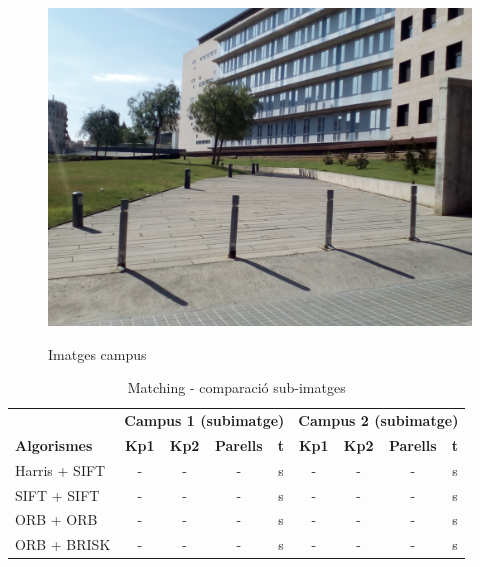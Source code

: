 \begin{figure}[!htb]
				\label{fig:awesome_image3}
			\endminipage\hfill
				\includegraphics[width=\linewidth]{images/experiments/uni4}
				\label{fig:awesome_image3}
			\endminipage
			\caption{Imatges campus}
		\end{figure}

		\begin{table}[H]
			\begin{center}
				\begin{tabular}{l | c c c c | c c c c}
					& \multicolumn{4}{c|}{\textbf{Campus 1 (subimatge)}} & \multicolumn{4}{c}{\textbf{Campus 2 (subimatge)}} \\
					\textbf{Algorismes} & \textbf{Kp1} & \textbf{Kp2} & \textbf{Parells} & \textbf{t} & \textbf{Kp1} & \textbf{Kp2} & \textbf{Parells} & \textbf{t} \\ \hline
					Harris + SIFT & - & - & - & s & - & - & - & s \\
					SIFT + SIFT & - & - & - & s & - & - & - & s \\
					ORB + ORB & - & - & - & s & - & - & - & s \\
					ORB + BRISK & - & - & - & s & - & - & - & s \\
				\end{tabular}
			\end{center}
			\caption{Matching - comparació sub-imatges}
		\end{table}

